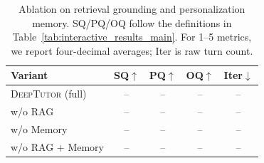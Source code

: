 \begin{table}[t]
\centering
\small
\begin{tabular}{lcccc}
\toprule
\textbf{Variant} & \textbf{SQ}$\uparrow$ & \textbf{PQ}$\uparrow$ & \textbf{OQ}$\uparrow$ & \textbf{Iter}$\downarrow$ \\
\midrule
\textsc{DeepTutor} (full)        & -- & -- & -- & -- \\
w/o RAG                          & -- & -- & -- & -- \\
w/o Memory                       & -- & -- & -- & -- \\
w/o RAG + Memory                 & -- & -- & -- & -- \\
\bottomrule
\end{tabular}
\caption{Ablation on retrieval grounding and personalization memory. SQ/PQ/OQ follow the definitions in Table~\ref{tab:interactive_results_main}. For 1--5 metrics, we report four-decimal averages; Iter is raw turn count.}
\label{tab:ablation_rag_memory}
\end{table}


